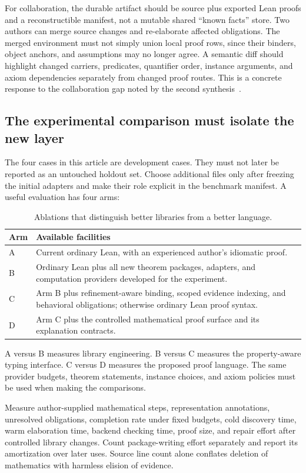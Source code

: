 \documentclass[11pt,letterpaper]{article}
\theoremstyle{definition}
\theoremstyle{remark}
\begin{document}
For collaboration, the durable artifact should be source plus exported Lean
proofs and a reconstructible manifest, not a mutable shared ``known facts''
store. Two authors can merge source changes and re-elaborate affected
obligations. The merged environment must not simply union local proof rows,
since their binders, object anchors, and assumptions may no longer agree. A
semantic diff should highlight changed carriers, predicates, quantifier order,
instance arguments, and axiom dependencies separately from changed proof routes.
This is a concrete response to the collaboration gap noted by the second
synthesis~\cite{B2}.

\subsection{The experimental comparison must isolate the new layer}
The four cases in this article are development cases. They must not later be
reported as an untouched holdout set. Choose additional files only after freezing
the initial adapters and make their role explicit in the benchmark manifest.
A useful evaluation has four arms:

\begin{table}[htbp]
\centering\small
\caption{Ablations that distinguish better libraries from a better language.}
\begin{tabularx}{\linewidth}{@{}P{.1\linewidth}Y@{}}
\toprule Arm & Available facilities\\\midrule
A & Current ordinary Lean, with an experienced author's idiomatic proof.\\
B & Ordinary Lean plus all new theorem packages, adapters, and computation
providers developed for the experiment.\\
C & Arm B plus refinement-aware binding, scoped evidence indexing, and
behavioral obligations; otherwise ordinary Lean proof syntax.\\
D & Arm C plus the controlled mathematical proof surface and its explanation
contracts.\\\bottomrule
\end{tabularx}
\end{table}

A versus B measures library engineering. B versus C measures the property-aware
typing interface. C versus D measures the proposed proof language. The same
provider budgets, theorem statements, instance choices, and axiom policies must
be used when making the comparisons.

Measure author-supplied mathematical steps, representation annotations, unresolved
obligations, completion rate under fixed budgets, cold discovery time, warm
elaboration time, backend checking time, proof size, and repair effort after
controlled library changes. Count package-writing effort separately and report
its amortization over later uses. Source line count alone conflates deletion of
mathematics with harmless elision of evidence.
\end{document}
